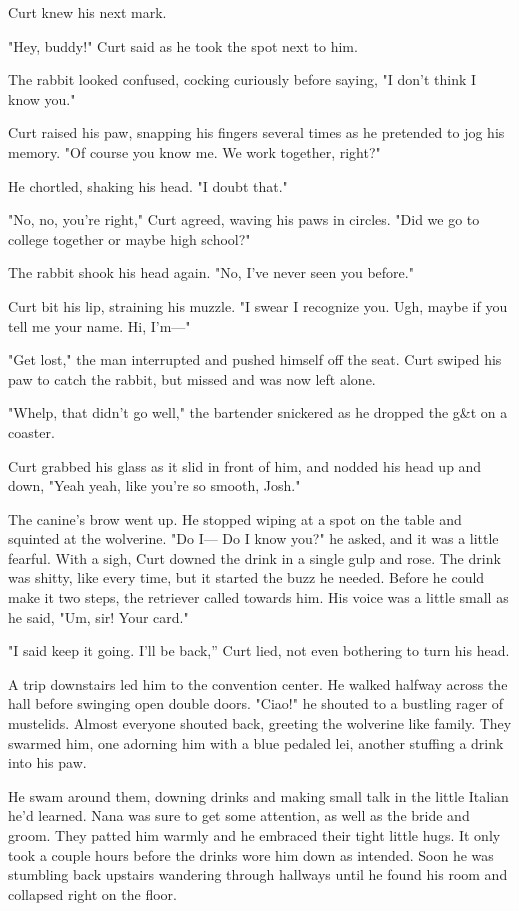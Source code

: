Curt knew his next mark.

"Hey, buddy!" Curt said as he took the spot next to him.

The rabbit looked confused, cocking curiously before saying, "I don't think I know you."

Curt raised his paw, snapping his fingers several times as he pretended to jog his memory. "Of course you know me. We work together, right?"

He chortled, shaking his head. "I doubt that."

"No, no, you're right," Curt agreed, waving his paws in circles. "Did we go to college together or maybe high school?"

The rabbit shook his head again. "No, I've never seen you before."

Curt bit his lip, straining his muzzle. "I swear I recognize you. Ugh, maybe if you tell me your name. Hi, I'm---"

"Get lost," the man interrupted and pushed himself off the seat. Curt swiped his paw to catch the rabbit, but missed and was now left alone.

"Whelp, that didn't go well," the bartender snickered as he dropped the g\&t on a coaster.

Curt grabbed his glass as it slid in front of him, and nodded his head up and down, "Yeah yeah, like you're so smooth, Josh."

The canine's brow went up. He stopped wiping at a spot on the table and squinted at the wolverine. "Do I--- Do I know you?" he asked, and it was a little fearful. With a sigh, Curt downed the drink in a single gulp and rose. The drink was shitty, like every time, but it started the buzz he needed. Before he could make it two steps, the retriever called towards him. His voice was a little small as he said, "Um, sir! Your card."

"I said keep it going. I'll be back,'' Curt lied, not even bothering to turn his head.

A trip downstairs led him to the convention center. He walked halfway across the hall before swinging open double doors. "Ciao!" he shouted to a bustling rager of mustelids. Almost everyone shouted back, greeting the wolverine like family. They swarmed him, one adorning him with a blue pedaled lei, another stuffing a drink into his paw.

He swam around them, downing drinks and making small talk in the little Italian he'd learned. Nana was sure to get some attention, as well as the bride and groom. They patted him warmly and he embraced their tight little hugs. It only took a couple hours before the drinks wore him down as intended. Soon he was stumbling back upstairs wandering through hallways until he found his room and collapsed right on the floor.

